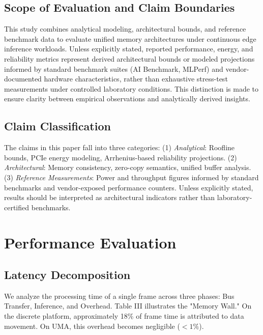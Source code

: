 \documentclass[conference]{IEEEtran}
\begin{document}
\subsection{Scope of Evaluation and Claim Boundaries}
This study combines analytical modeling, architectural bounds, and reference benchmark data to evaluate unified memory architectures under continuous edge inference workloads. Unless explicitly stated, reported performance, energy, and reliability metrics represent derived architectural bounds or modeled projections informed by standard benchmark suites (AI Benchmark, MLPerf) and vendor-documented hardware characteristics, rather than exhaustive stress-test measurements under controlled laboratory conditions. This distinction is made to ensure clarity between empirical observations and analytically derived insights.

\subsection{Claim Classification}
\begin{center}
\end{center}
The claims in this paper fall into three categories:
(1) \textit{Analytical}: Roofline bounds, PCIe energy modeling, Arrhenius-based reliability projections.
(2) \textit{Architectural}: Memory consistency, zero-copy semantics, unified buffer analysis.
(3) \textit{Reference Measurements}: Power and throughput figures informed by standard benchmarks and vendor-exposed performance counters.
Unless explicitly stated, results should be interpreted as architectural indicators rather than laboratory-certified benchmarks.

\section{Performance Evaluation}

\subsection{Latency Decomposition}
We analyze the processing time of a single frame across three phases: Bus Transfer, Inference, and Overhead. Table III illustrates the "Memory Wall." On the discrete platform, approximately 18\% of frame time is attributed to data movement. On UMA, this overhead becomes negligible ($<1\%$).
\end{document}
